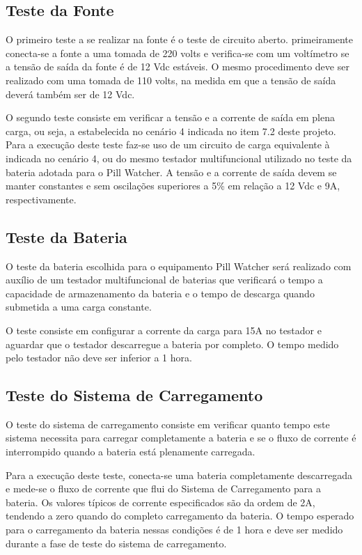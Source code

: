\subsection{Teste da Fonte}
O primeiro teste a se realizar na fonte é o teste de circuito aberto. primeiramente conecta-se a fonte a uma tomada de 220 volts e verifica-se com um voltímetro se a tensão de saída da fonte é de 12 Vdc estáveis. O mesmo procedimento deve ser realizado com uma tomada de 110 volts, na medida em que a tensão de saída deverá também ser de 12 Vdc.

O segundo teste consiste em verificar a tensão e a corrente de saída em plena carga, ou seja, a estabelecida no cenário 4 indicada no item 7.2 deste projeto. Para a execução deste teste faz-se uso de um circuito de carga equivalente à indicada no cenário 4, ou do mesmo testador multifuncional utilizado no teste da bateria adotada para o Pill Watcher. A tensão e a corrente de saída devem se manter constantes e sem oscilações superiores a 5\% em relação a 12 Vdc e 9A, respectivamente.

\subsection{Teste da Bateria}
O teste da bateria escolhida para o equipamento Pill Watcher será realizado com auxílio de um testador multifuncional de baterias que verificará o tempo a capacidade de armazenamento da bateria e o tempo de descarga quando submetida a uma carga constante.

O teste consiste em configurar a corrente da carga para 15A no testador e aguardar que o testador descarregue a bateria por completo. O tempo medido pelo testador não deve ser inferior a 1 hora.

\subsection{Teste do Sistema de Carregamento}
O teste do sistema de carregamento consiste em verificar quanto tempo este sistema necessita para carregar completamente a bateria e se o fluxo de corrente é interrompido quando a bateria está plenamente carregada. 

Para a execução deste teste, conecta-se uma bateria completamente descarregada e mede-se o fluxo de corrente que flui do Sistema de Carregamento para a bateria. Os valores típicos de corrente especificados são da ordem de 2A, tendendo a zero quando do completo carregamento da bateria. O tempo esperado para o carregamento da bateria nessas condições é de 1 hora e deve ser medido durante a fase de teste do sistema de carregamento.


